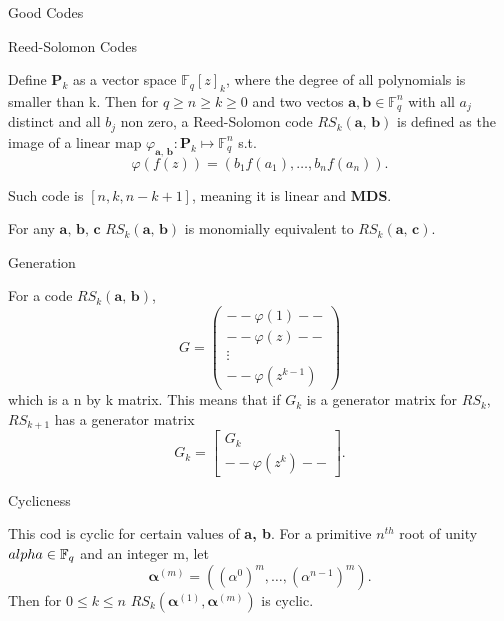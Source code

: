\documentclass[12pt, letterpaper]{article}
\newcommand{\F}{\mathbb{F}}
\begin{document}
\begin{section}{Good Codes}

  \begin{subsection}{Reed-Solomon Codes}

    Define \(\textbf{P}_{k}\) as a vector space \(\F_{q}[z]_{k}\), where the
    degree of all polynomials is smaller than k. Then for \(q \geq n \geq k
    \geq 0\) and two vectos \(\textbf{a}, \textbf{b} \in \F^{n}_{q}\) with all
    \(a_{j}\) distinct and all \(b_{j}\) non zero, a Reed-Solomon code
    \(RS_{k}(\textbf{a, b})\) is defined as the image of a linear map
    \(\varphi_{\textbf{a, b}}: \textbf{P}_{k} \mapsto \F^{n}_{q}\) s.t.
    \[\varphi(f(z)) = (b_{1} f(a_{1}), \dots , b_{n} f(a_{n})).\]

    Such code is \([n, k, n - k + 1]\), meaning it is linear and \textbf{MDS}.

    For any \(\textbf{a, b, c}\) \(RS_{k}(\textbf{a, b})\) is monomially
    equivalent to \(RS_{k}(\textbf{a, c})\).

    \begin{subsubsection}{Generation}

      For a code \(RS_{k}(\textbf{a, b})\), \[G =
        \begin{pmatrix}
          -- \varphi(1) -- \\
          -- \varphi(z) -- \\
          \vdots \\
          -- \varphi(z^{k - 1})
        \end{pmatrix}
      \]
      which is a n by k matrix. This means that if \(G_{k}\) is a generator
      matrix for \(RS_{k}\), \(RS_{k + 1}\) has a generator matrix \[G_{k} =
        \begin{bmatrix}
          G_{k} \\
          -- \varphi(z^{k}) --
        \end{bmatrix}.
      \]

    \end{subsubsection}

    \begin{subsubsection}{Cyclicness}

      This cod is cyclic for certain values of \textbf{a, b}. For a primitive
      \(n^{th}\) root of unity \(\\alpha \in \F_{q}\) and an integer m, let
      \[\mathbf{\alpha}^{(m)} = ((\alpha^{0})^{m}, \dots , (\alpha^{n - 1})^{m}).\]
      Then for \(0 \leq k \leq n\) \(RS_{k}(\mathbf{\alpha}^{(1)},
      \mathbf{\alpha}^{(m)})\) is cyclic.


\end{subsubsection}
\end{subsection}
\end{section}
\end{document}
